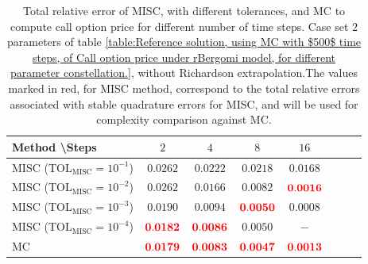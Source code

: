 \FloatBarrier


\begin{table}[h!]
	\centering
	\begin{tabular}{l*{6}{c}r}
		Method \textbackslash  Steps            & $2$ & $4$ & $8$ & $16$  \\
		\hline
		MISC ($\text{TOL}_{\text{MISC}}=10^{-1}$)  &  $\mathbf{0.0262}$ & $\mathbf{0.0222}$& $\mathbf{ 0.0218}$ & $\mathbf{ 0.0168}$   \\
		MISC ($\text{TOL}_{\text{MISC}}=10^{-2}$)  &  $\mathbf{0.0262}$ & $\mathbf{0.0166}$& $\mathbf{ 0.0082}$ & $\mathbf{ {\color{red}0.0016}}$  \\
		MISC ($\text{TOL}_{\text{MISC}}=10^{-3}$)  &  $\mathbf{0.0190}$ & $\mathbf{0.0094}$& $\mathbf{{\color{red}0.0050}}$  & $\mathbf{ 0.0008}$  \\
		MISC ($\text{TOL}_{\text{MISC}}=10^{-4}$)  &  $\mathbf{{\color{red}0.0182}}$ & $\mathbf{{\color{red}0.0086}}$& $\mathbf{0.0050}$ & $\mathbf{ -}$ \\
		\hline
		MC    & $\mathbf{{\color{red}0.0179}}$  & $\mathbf{ {\color{red}0.0083}}$  & $\mathbf{{\color{red}0.0047}}$ & $\mathbf{ {\color{red}0.0013}}$  \\		
		\hline
	\end{tabular}
	\caption{Total relative error of MISC, with different tolerances, and MC to compute call option price for different number of time steps. Case set $2$ parameters of table \ref{table:Reference solution, using MC with $500$ time steps, of Call option price under rBergomi model, for different parameter constellation.}, without Richardson extrapolation.The values marked in red, for MISC method, correspond to the total relative errors associated with  stable quadrature errors for MISC, and will be used for complexity comparison against MC.}
	\label{Total error of MISC and MC to compute Call option price of the different tolerances for different number of time steps. Case set 3, without Richardson extrapolation. The numbers between parentheses are the corresponding absolute errors.}
\end{table}


